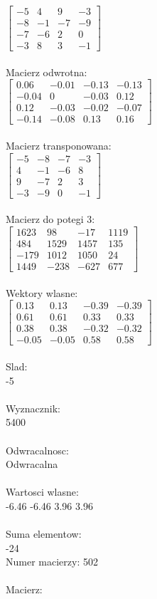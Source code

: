 \documentclass[a4paper,12pt]{article}
\begin{document}
$\begin{bmatrix} -5&4&9&-3\\-8&-1&-7&-9\\-7&-6&2&0\\-3&8&3&-1 \end{bmatrix}$
\\
\\
Macierz odwrotna:\\

$\begin{bmatrix} 0.06&-0.01&-0.13&-0.13\\-0.04&0&-0.03&0.12\\0.12&-0.03&-0.02&-0.07\\-0.14&-0.08&0.13&0.16 \end{bmatrix}$
\\
\\
Macierz transponowana:\\

$\begin{bmatrix} -5&-8&-7&-3\\4&-1&-6&8\\9&-7&2&3\\-3&-9&0&-1 \end{bmatrix}$
\\
\\
Macierz do potegi 3:\\

$\begin{bmatrix} 1623&98&-17&1119\\484&1529&1457&135\\-179&1012&1050&24\\1449&-238&-627&677 \end{bmatrix}$
\\
\\
Wektory wlasne:\\

$\begin{bmatrix} 0.13&0.13&-0.39&-0.39\\0.61&0.61&0.33&0.33\\0.38&0.38&-0.32&-0.32\\-0.05&-0.05&0.58&0.58 \end{bmatrix}$
\\
\\
Slad:\\
-5
\\
\\
Wyznacznik:\\
5400
\\
\\
Odwracalnosc:\\
Odwracalna
\\
\\
Wartosci wlasne:\\
-6.46 -6.46 3.96 3.96
\\
\\
Suma elementow:\\
-24
\\
\newpage
Numer macierzy:
502
\\
\\
Macierz:\\
\end{document}
